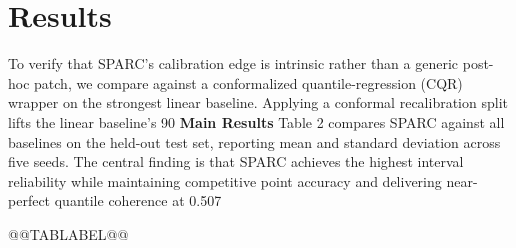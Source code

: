 {\section{Results}
To verify that SPARC's calibration edge is intrinsic rather than a generic post-hoc patch, we compare against a conformalized quantile-regression (CQR) wrapper on the strongest linear baseline. Applying a conformal recalibration split lifts the linear baseline's 90%
\textbf{Main Results}
Table 2 compares SPARC against all baselines on the held-out test set, reporting mean and standard deviation across five seeds. The central finding is that SPARC achieves the highest interval reliability while maintaining competitive point accuracy and delivering near-perfect quantile coherence at 0.507%
\begin{table}[t]
\caption{}
@@TABLABEL@@
\centering
\resizebox{\columnwidth}{!}{
\begin{tabular}{lllllllll}
\toprule
\textbf{Method} & \textbf{Coverage (90%
\midrule
SPARC (proposed) & \textbf{87.94 $\pm$ 0.41} & \textbf{20.72 $\pm$ 0.52} & 2.20 $\pm$ 0.03 & 1.335 $\pm$ 0.009 & 3.20 $\pm$ 0.05 & 4.45 $\pm$ 0.04 & \textbf{0.507 $\pm$ 0.15} & 14.29 \\
MLP & 84.36 $\pm$ 0.52 & 24.71 $\pm$ 0.49 & 2.72 $\pm$ 0.06 & 1.639 $\pm$ 0.025 & 3.88 $\pm$ 0.07 & 5.09 $\pm$ 0.06 & 8.581 $\pm$ 1.24 & 16.91 \\
LSTM & 80.50 $\pm$ 0.71 & 25.59 $\pm$ 0.58 & 2.59 $\pm$ 0.04 & 1.574 $\pm$ 0.022 & 3.95 $\pm$ 0.06 & 5.31 $\pm$ 0.05 & 8.944 $\pm$ 1.35 & 12.31 \\
XGBoost & 77.49 $\pm$ 0.58 & 25.65 $\pm$ 0.52 & 3.00 $\pm$ 0.05 & 1.838 $\pm$ 0.031 & 4.90 $\pm$ 0.06 & 6.14 $\pm$ 0.06 & 54.164 $\pm$ 4.82 & 14.10 \\
LQR & 73.24 $\pm$ 0.55 & 26.20 $\pm$ 0.48 & 2.15 $\pm$ 0.03 & 1.314 $\pm$ 0.010 & 3.27 $\pm$ 0.04 & 4.48 $\pm$ 0.04 & 17.785 $\pm$ 2.15 & 7.85 \\
Random Forest & 42.58 $\pm$ 0.49 & 46.62 $\pm$ 0.68 & 4.02 $\pm$ 0.05 & 2.440 $\pm$ 0.039 & 6.06 $\pm$ 0.07 & 7.46 $\pm$ 0.06 & 0.000 $\pm$ 0.00 & 13.10 \\
}
\end{tabular}}
\end{table}}
